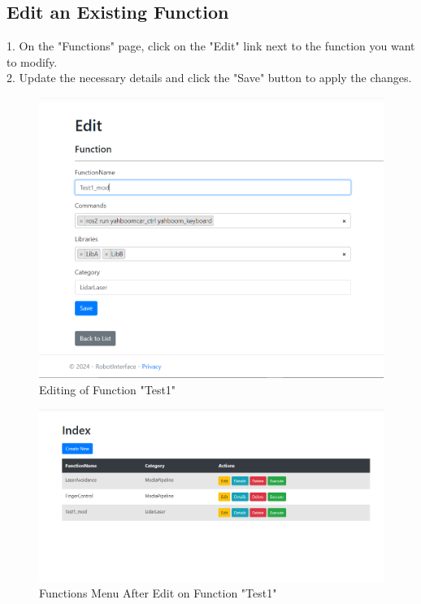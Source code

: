 \documentclass[12pt,a4paper]{scrbook}
\begin{document}
	\subsection{Edit an Existing Function}
	1. On the "Functions" page, click on the "Edit" link next to the function you want to modify.\\
	2. Update the necessary details and click the "Save" button to apply the changes.\\
		\begin{figure}[H]
		\centering
		\includegraphics[width=\linewidth]{Images/edit.png}
		\caption{Editing of Function "Test1"}
		\label{}
	\end{figure}
		\begin{figure}[H]
		\centering
		\includegraphics[width=\linewidth]{Images/afteredit.png}
		\caption{Functions Menu After Edit on Function "Test1"}
		\label{}
	\end{figure}
\end{document}
